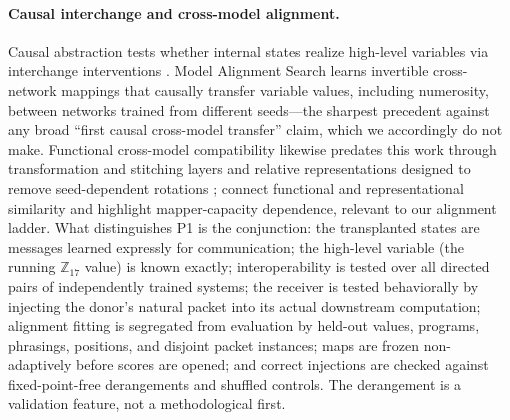 \documentclass[11pt]{article}
\begin{document}
\paragraph{Causal interchange and cross-model alignment.}
Causal abstraction tests whether internal states realize high-level variables via interchange interventions \citep{geiger2021causal}. Model Alignment Search \citep{grant2025mas} learns invertible cross-network mappings that causally transfer variable values, including numerosity, between networks trained from different seeds---the sharpest precedent against any broad ``first causal cross-model transfer'' claim, which we accordingly do not make. Functional cross-model compatibility likewise predates this work through transformation and stitching layers \citep{lenc2014equivariance,bansal2021stitching} and relative representations designed to remove seed-dependent rotations \citep{moschella2022relative}; \citet{almudevar2026usable} connect functional and representational similarity and highlight mapper-capacity dependence, relevant to our alignment ladder. What distinguishes P1 is the conjunction: the transplanted states are messages learned expressly for communication; the high-level variable (the running $\mathbb{Z}_{17}$ value) is known exactly; interoperability is tested over all directed pairs of independently trained systems; the receiver is tested behaviorally by injecting the donor's natural packet into its actual downstream computation; alignment fitting is segregated from evaluation by held-out values, programs, phrasings, positions, and disjoint packet instances; maps are frozen non-adaptively before scores are opened; and correct injections are checked against fixed-point-free derangements and shuffled controls. The derangement is a validation feature, not a methodological first.
\end{document}
